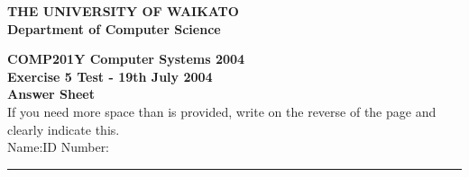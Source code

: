 \documentclass[a4paper,10pt]{article}
\begin{document}
\vspace*{-1cm} 

{\centering \large \bf THE UNIVERSITY OF WAIKATO\\}
{\centering \large \bf Department of Computer Science\\[0.5cm]}

{\centering \large \bf COMP201Y Computer Systems 2004\\}
{\centering \large \bf Exercise 5 Test - 19th July 2004\\[1cm]}
{\centering \large \bf Answer Sheet\\[5mm]}
If you need more space than is provided, write on the reverse of the
page and clearly indicate this.\\[5mm]
Name:\hspace*{5cm}ID Number:\\
\hrule
\end{document}
